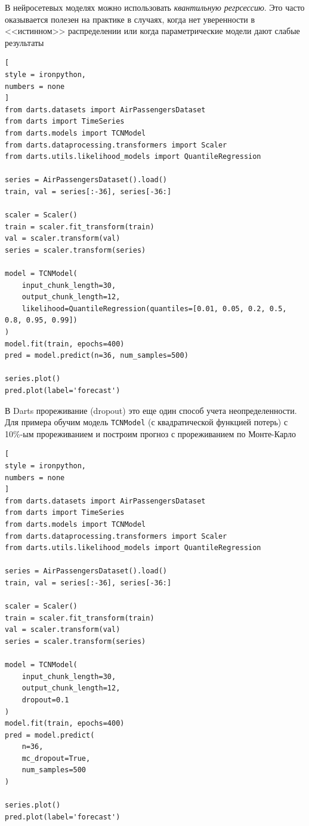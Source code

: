 \documentclass[%
	11pt,
	a4paper,
	utf8,
		]{article}
\begin{document}
В нейросетевых моделях можно использовать \emph{квантильную регрсессию}. Это часто оказывается полезен на практике в случаях, когда нет уверенности в <<истинном>> распределении или когда параметрические модели дают слабые результаты
\begin{lstlisting}[
style = ironpython,
numbers = none
]
from darts.datasets import AirPassengersDataset
from darts import TimeSeries
from darts.models import TCNModel
from darts.dataprocessing.transformers import Scaler
from darts.utils.likelihood_models import QuantileRegression

series = AirPassengersDataset().load()
train, val = series[:-36], series[-36:]

scaler = Scaler()
train = scaler.fit_transform(train)
val = scaler.transform(val)
series = scaler.transform(series)

model = TCNModel(
    input_chunk_length=30,
    output_chunk_length=12,
    likelihood=QuantileRegression(quantiles=[0.01, 0.05, 0.2, 0.5, 0.8, 0.95, 0.99])
)
model.fit(train, epochs=400)
pred = model.predict(n=36, num_samples=500)

series.plot()
pred.plot(label='forecast')
\end{lstlisting}

В Darts прореживание (dropout) это еще один способ учета неопределенности. Для примера обучим модель \verb|TCNModel| (с квадратической функцией потерь) с 10\%-ым прореживанием и построим прогноз с прореживанием по Монте-Карло
\begin{lstlisting}[
style = ironpython,
numbers = none
]
from darts.datasets import AirPassengersDataset
from darts import TimeSeries
from darts.models import TCNModel
from darts.dataprocessing.transformers import Scaler
from darts.utils.likelihood_models import QuantileRegression

series = AirPassengersDataset().load()
train, val = series[:-36], series[-36:]

scaler = Scaler()
train = scaler.fit_transform(train)
val = scaler.transform(val)
series = scaler.transform(series)

model = TCNModel(
    input_chunk_length=30,
    output_chunk_length=12,
    dropout=0.1
)
model.fit(train, epochs=400)
pred = model.predict(
    n=36,
    mc_dropout=True,
    num_samples=500
)

series.plot()
pred.plot(label='forecast')
\end{lstlisting}
\end{document}
